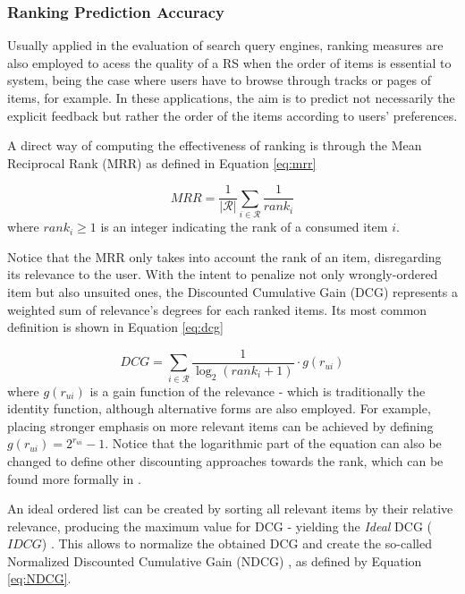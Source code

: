 \subsubsection{Ranking Prediction Accuracy}

Usually applied in the evaluation of search query engines, ranking measures are also employed to acess the quality of a RS when the order of items is essential to system, being the case where users have to browse through tracks or pages of items, for example. In these applications, the aim is to predict not necessarily the explicit feedback but rather the order of the items according to users' preferences. 

A direct way of computing the effectiveness of ranking is through the Mean Reciprocal Rank (MRR)  as defined in Equation \ref{eq:mrr}

\begin{equation}
\label{eq:mrr}
MRR = \frac{1}{|\mathcal{R}|}\sum_{i \in \mathcal{R}} \frac{1}{rank_i}
\end{equation} where $rank_i \geq 1$ is an integer indicating the rank of a consumed item $i$. 

Notice that the MRR only takes into account the rank of an item, disregarding its relevance to the user. With the intent to penalize not only wrongly-ordered item but also unsuited ones, the Discounted Cumulative Gain (DCG)  \cite{10.1145/582415.582418} represents a weighted sum of relevance's degrees for each ranked items. Its most common definition is shown in Equation \ref{eq:dcg}

\begin{equation}
    \label{eq:dcg}
    DCG = \sum_{i \in \mathcal{R}} \frac{1}{\log_2(rank_i+1)} \cdot g(r_{ui})
\end{equation} where $g(r_{ui})$ is a gain function of the relevance - which is traditionally the identity function, although alternative forms are also employed. For example, placing stronger emphasis on more relevant items can be achieved by defining $g(r_{ui}) = 2^{r_{ui}}-1$. Notice that the logarithmic part of the equation can also be changed to define other discounting approaches towards the rank, which can be found more formally in \cite{NDCGref}.

An ideal ordered list can be created by sorting all relevant items by their relative relevance, producing the maximum value for DCG - yielding the \textit{Ideal} DCG ($IDCG$) . This allows to normalize the obtained DCG and create the so-called Normalized Discounted Cumulative Gain (NDCG) , as defined by Equation \ref{eq:NDCG}.

